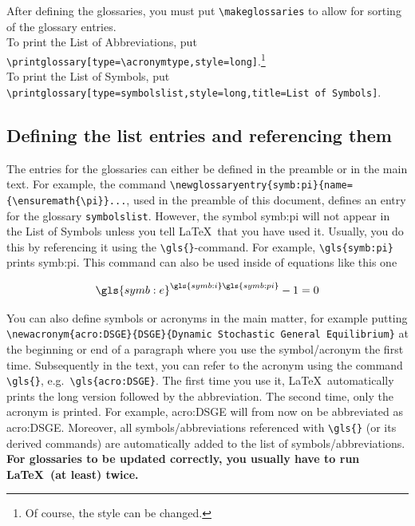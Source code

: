 \documentclass[a4paper,12pt]{scrartcl} %
\begin{document}
After defining the glossaries, you must put \verb|\makeglossaries| to allow for sorting of the glossary entries.\\

To print the List of Abbreviations, put\\
\verb|\printglossary[type=\acronymtype,style=long]|.\footnote{Of course, the style can be changed.}\\
To print the List of Symbols, put\\
\verb|\printglossary[type=symbolslist,style=long,title=List of Symbols]|.

\subsection{Defining the list entries and referencing them}
The entries for the glossaries can either be defined in the preamble or in the main text. For example, the command
\verb|\newglossaryentry{symb:pi}{name={\ensuremath{\pi}}...|, used in the preamble of this document, defines an entry for the glossary \texttt{symbolslist}. However, the symbol \gls{symb:pi} will not appear in the List of Symbols unless you tell \LaTeX\ that you have used it. Usually, you do this by referencing it using the \verb|\gls{}|-command. For example, \verb|\gls{symb:pi}| prints \gls{symb:pi}. This command can also be used inside of equations like this one

\begin{equation}
  \gls{symb:e}^{\gls{symb:i}\gls{symb:pi}}-1=0
\end{equation}


You can also define symbols or acronyms in the main matter, for example putting \verb|\newacronym{acro:DSGE}{DSGE}{Dynamic Stochastic General Equilibrium}| at the beginning or end of a paragraph where you use the symbol/acronym the first time. Subsequently in the text, you can refer to the acronym using the command \verb|\gls{}|, e.g.\ \verb|\gls{acro:DSGE}|. The first time you use it, \LaTeX\ automatically prints the long version followed by the abbreviation. The second time, only the acronym is printed. For example, \gls{acro:DSGE} will from now on be abbreviated as \gls{acro:DSGE}. Moreover, all symbols/abbreviations referenced with \verb|\gls{}| (or its derived commands) are automatically added to the list of symbols/abbreviations.\\
\textbf{For glossaries to be updated correctly, you usually have to run \LaTeX\ (at least) twice.}\\
\end{document}
